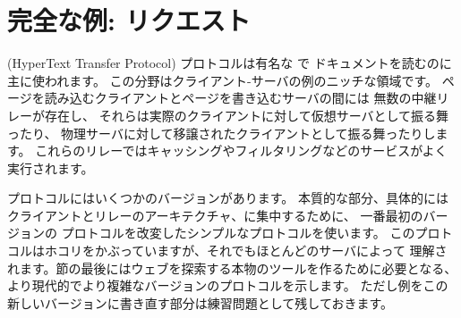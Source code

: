 \section{完全な例: {\normalfont \http} リクエスト}

\http (HyperText Transfer Protocol) プロトコルは有名な  で
ドキュメントを読むのに主に使われます。
この分野はクライアント-サーバの例のニッチな領域です。
ページを読み込むクライアントとページを書き込むサーバの間には
無数の中継リレーが存在し、
それらは実際のクライアントに対して仮想サーバとして振る舞ったり、
物理サーバに対して移譲されたクライアントとして振る舞ったりします。
これらのリレーではキャッシングやフィルタリングなどのサービスがよく実行されます。

\http プロトコルにはいくつかのバージョンがあります。
本質的な部分、具体的にはクライアントとリレーのアーキテクチャ、に集中するために、
一番最初のバージョンの \http プロトコルを改変したシンプルなプロトコルを使います。
このプロトコルはホコリをかぶっていますが、それでもほとんどのサーバによって
理解されます。節の最後にはウェブを探索する本物のツールを作るために必要となる、
より現代的でより複雑なバージョンのプロトコルを示します。
ただし例をこの新しいバージョンに書き直す部分は練習問題として残しておきます。

